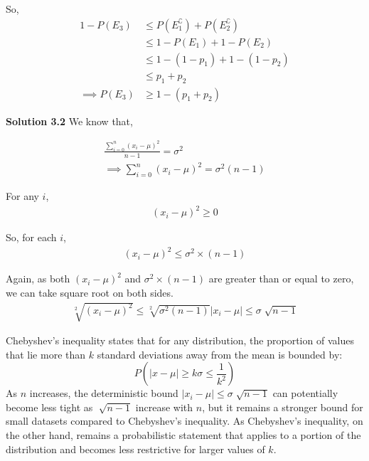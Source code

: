 \begin{tcolorbox}[breakable]
\begin{sol}
		So,
		\begin{align}
			1-P(E_3)        & \leq P(E_1^\complement) + P(E_2^\complement) \\
			                & \leq 1-P(E_1) + 1-P(E_2)                     \\
			                & \leq 1-(1-p_1) + 1-(1-p_2)                   \\
			                & \leq p_1 +p_2                                \\
			\implies P(E_3) & \geq 1-(p_1+p_2)
		\end{align}


		\textbf{Solution 3.2}
		We know that,

		\begin{align}
			\frac{\sum^n_{i=0}(x_i-\mu)^2}{n-1}=\sigma^2 \\
			\implies \sum^n_{i=0}(x_i-\mu)^2 = \sigma^2(n-1)
		\end{align}

		For any $i$,
		\begin{align}
			(x_i-\mu)^2\geq0
		\end{align}

		So, for each $i$,
		\begin{align}
			(x_i-\mu)^2\leq\sigma^2\times(n-1)
		\end{align}

		Again, as both $(x_i-\mu)^2$ and $\sigma^2\times(n-1)$ are
		greater than or equal to zero, we can take square root on both
		sides.
		\begin{align}
			\sqrt[2]{(x_i-\mu)^2}\leq\sqrt[2]{\sigma^2(n-1)}
			|x_i-\mu|\leq\sigma\sqrt[]{n-1}
		\end{align}

		Chebyshev's inequality states that for any distribution, the
		proportion of values that lie more than $k$ standard deviations
		away from the mean is bounded by: \[P(|x-\mu | \geq k\sigma\leq
			\frac{1}{k^2})\] As $n$ increases, the deterministic bound
		$|x_i-\mu|\leq \sigma\sqrt[]{n-1}$ can potentially become less
		tight as $\sqrt[]{n-1}$ increase with $n$, but it remains a
		stronger bound for small datasets compared to Chebyshev's
		inequality. As Chebyshev's inequality, on the other hand,
		remains a probabilistic statement that applies to a portion of
		the distribution and becomes less restrictive for larger values
		of $k$.
	\end{sol}
\end{tcolorbox}
